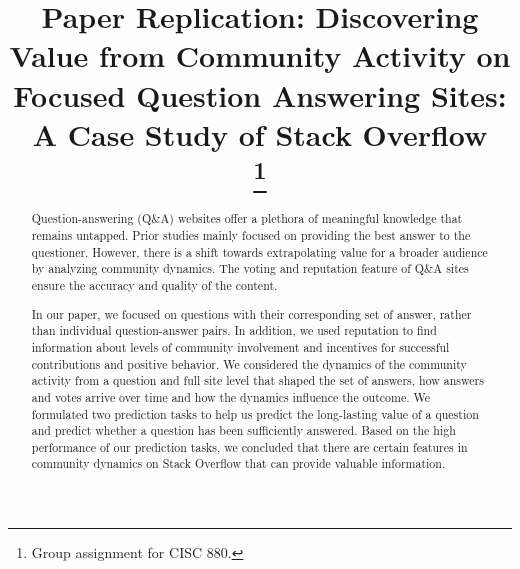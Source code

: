 \documentclass[conference]{IEEEtran}
\begin{document}
\title{Paper Replication: Discovering Value from Community Activity on Focused Question Answering Sites: A Case Study of Stack Overflow\\
\thanks{Group assignment for CISC 880.}
}

\author{
}

\maketitle

\begin{abstract}
Question-answering (Q\&A) websites offer a plethora of meaningful knowledge that remains untapped. Prior studies mainly focused on providing the best answer to the questioner. However, there is a shift towards extrapolating value for a broader audience by analyzing community dynamics. The voting and reputation feature of Q\&A sites ensure the accuracy and quality of the content.


In our paper, we focused on questions with their corresponding set of answer, rather than individual question-answer pairs. In addition, we used reputation to find information about levels of community involvement and incentives for successful contributions and positive behavior. We considered the dynamics of the community activity from a question and full site level that shaped the set of answers, how answers and votes arrive over time and how the dynamics influence the outcome. We formulated two prediction tasks to help us predict the long-lasting value of a question and predict whether a question has been sufficiently answered. Based on the high performance of our prediction tasks, we concluded that there are certain features in community dynamics on Stack Overflow that can provide valuable information.

\end{abstract}
\end{document}
